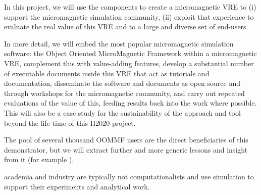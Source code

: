 In this project, we will use the \TheProject components to create a
micromagnetic VRE to (i) support the micromagnetic simulation
community, (ii) exploit that experience to evaluate the real value of
this VRE and \TheProject to a large and diverse set of end-users.

In more detail, we will embed the most popular micromagnetic
simulation software: the Object Oriented MicroMagnetic Framework
\cite{OOMMF-url} within a micromagnetic VRE, complement this with
value-adding features, develop a substantial number of executable
documents inside this VRE that act as tutorials and documentation,
disseminate the software and documents as open source and through
workshops for the micromagnetic community, and carry out repeated
evaluations of the value of this, feeding results back into the
\TheProject work where possible. This will also be a case study for
the sustainability of the approach and tool beyond the life time of
this H2020 project.

The pool of several thousand OOMMF users are the direct beneficiaries
of this demonstrator, but we will extract further and more generic
lessons and insight from it (for example
).





% 
  academia and industry are typically not computationalists and use
  simulation to support their experiments and analytical work.